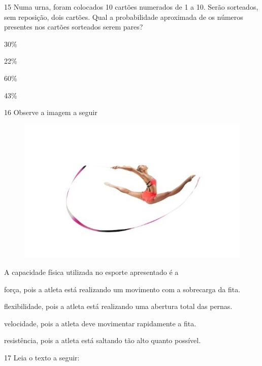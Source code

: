 \num{15} Numa urna, foram colocados 10 cartões numerados de 1 a 10. Serão
sorteados, sem reposição, dois cartões. Qual a probabilidade
aproximada de os números presentes nos cartões sorteados serem pares?

\begin{escolha}

  \item 30\%

  \item 22\%

  \item 60\%

  \item 43\%

\end{escolha}

\num{16} Observe a imagem a seguir

\begin{figure}[htpb!]
\centering
\includegraphics[width=.5\textwidth]{./imgs/img5.jpg}
\end{figure}

A capacidade física utilizada no esporte apresentado é a

\begin{escolha}
\item força, pois a atleta está realizando um movimento com a sobrecarga da fita.

\item flexibilidade, pois a atleta está realizando uma abertura total das
pernas.

\item velocidade, pois a atleta deve movimentar rapidamente a fita.

\item resistência, pois a atleta está saltando tão alto quanto possível.
\end{escolha}

\pagebreak
\num{17} Leia o texto a seguir:

